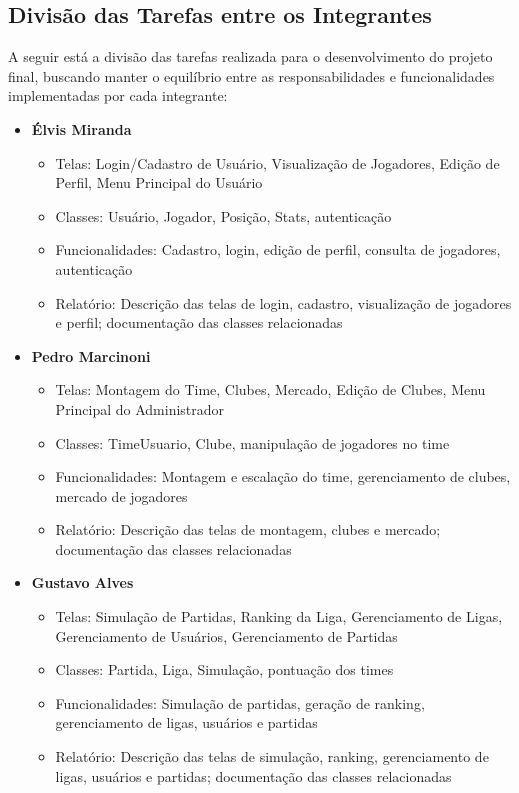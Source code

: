 \documentclass[12pt]{article}
\begin{document}
\subsection{Divisão das Tarefas entre os Integrantes}
\label{sec:divisao_tarefas}

A seguir está a divisão das tarefas realizada para o desenvolvimento do projeto final, buscando manter o equilíbrio entre as responsabilidades e funcionalidades implementadas por cada integrante:

\begin{itemize}
  \item \textbf{Élvis Miranda}
        \begin{itemize}
          \item Telas: Login/Cadastro de Usuário, Visualização de Jogadores, Edição de Perfil, Menu Principal do Usuário
          \item Classes: Usuário, Jogador, Posição, Stats, autenticação
          \item Funcionalidades: Cadastro, login, edição de perfil, consulta de jogadores, autenticação
          \item Relatório: Descrição das telas de login, cadastro, visualização de jogadores e perfil; documentação das classes relacionadas
        \end{itemize}
  \item \textbf{Pedro Marcinoni}
        \begin{itemize}
          \item Telas: Montagem do Time, Clubes, Mercado, Edição de Clubes, Menu Principal do Administrador
          \item Classes: TimeUsuario, Clube, manipulação de jogadores no time
          \item Funcionalidades: Montagem e escalação do time, gerenciamento de clubes, mercado de jogadores
          \item Relatório: Descrição das telas de montagem, clubes e mercado; documentação das classes relacionadas
        \end{itemize}
  \item \textbf{Gustavo Alves}
        \begin{itemize}
          \item Telas: Simulação de Partidas, Ranking da Liga, Gerenciamento de Ligas, Gerenciamento de Usuários, Gerenciamento de Partidas
          \item Classes: Partida, Liga, Simulação, pontuação dos times
          \item Funcionalidades: Simulação de partidas, geração de ranking, gerenciamento de ligas, usuários e partidas
          \item Relatório: Descrição das telas de simulação, ranking, gerenciamento de ligas, usuários e partidas; documentação das classes relacionadas
        \end{itemize}
\end{itemize}
\end{document}
